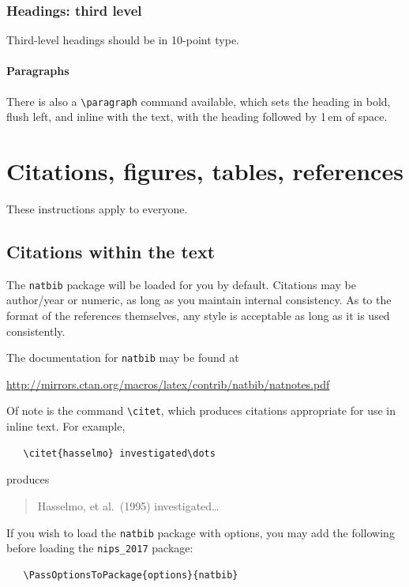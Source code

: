 \documentclass{article}
\begin{document}
\subsubsection{Headings: third level}

Third-level headings should be in 10-point type.

\paragraph{Paragraphs}

There is also a \verb+\paragraph+ command available, which sets the
heading in bold, flush left, and inline with the text, with the
heading followed by 1\,em of space.

\section{Citations, figures, tables, references}
\label{others}

These instructions apply to everyone.

\subsection{Citations within the text}

The \verb+natbib+ package will be loaded for you by default.
Citations may be author/year or numeric, as long as you maintain
internal consistency.  As to the format of the references themselves,
any style is acceptable as long as it is used consistently.

The documentation for \verb+natbib+ may be found at
\begin{center}
  \url{http://mirrors.ctan.org/macros/latex/contrib/natbib/natnotes.pdf}
\end{center}
Of note is the command \verb+\citet+, which produces citations
appropriate for use in inline text.  For example,
\begin{verbatim}
   \citet{hasselmo} investigated\dots
\end{verbatim}
produces
\begin{quote}
  Hasselmo, et al.\ (1995) investigated\dots
\end{quote}

If you wish to load the \verb+natbib+ package with options, you may
add the following before loading the \verb+nips_2017+ package:
\begin{verbatim}
   \PassOptionsToPackage{options}{natbib}
\end{verbatim}
\end{document}
